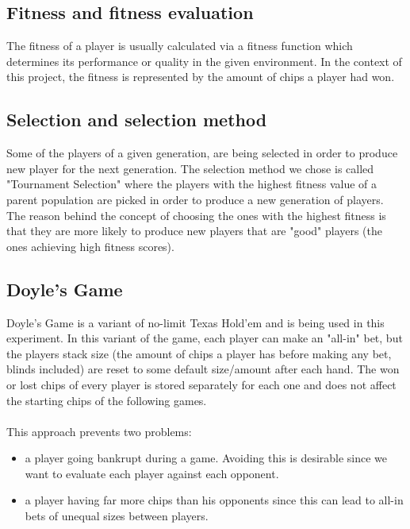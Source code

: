 \documentclass[12pt,fleqn,a4paper]{article}
\begin{document}
\subsection{Fitness and fitness evaluation}
\label{fitness}
The fitness of a player is usually calculated via a fitness function which determines its performance or quality in the given environment. In the context of this project, the fitness is represented by the amount of chips a player had won.

\subsection{Selection and selection method}
\label{selection}
Some of the players of a given generation, are being selected in order to produce new player for the next generation. The selection method we chose is called "Tournament Selection" where the players with the highest fitness value of a parent population are picked in order to produce a new generation of players. The reason behind the concept of choosing the ones with the highest fitness is that they are more likely to produce new players that are "good" players (the ones achieving high fitness scores). 

\subsection{Doyle's Game}
\label{doyle}
Doyle's Game is a variant of no-limit Texas Hold'em and is being used in this experiment. In this variant of the game, each player can make an "all-in" bet, but the players stack size (the amount of chips a player has before making any bet, blinds included) are reset to some default size/amount after each hand. The won or lost chips of every player is stored separately for each one and does not affect the starting chips of the following games.\\\\
This approach prevents two problems:
\begin{itemize}
	\item a player going bankrupt during a game. Avoiding this is desirable since we want to evaluate each player against each opponent.
	\item a player having far more chips than his opponents since this can lead to all-in bets of unequal sizes between players.
\end{itemize}
\end{document}
